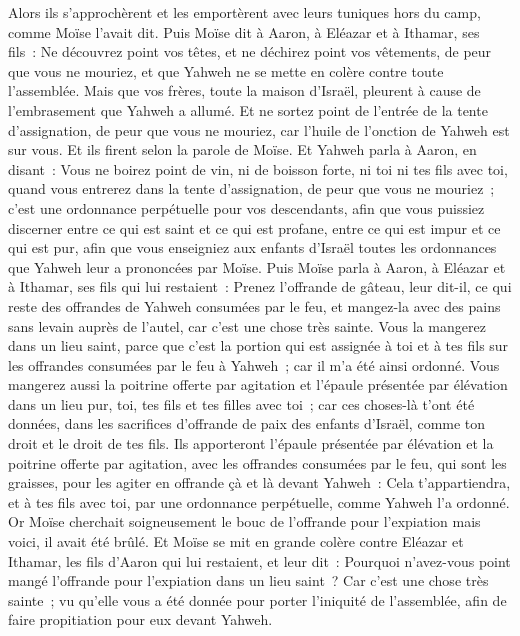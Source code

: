 \begin{multicols}{2}
Alors ils s'approchèrent et les emportèrent avec leurs tuniques hors du camp, comme Moïse l'avait dit.
Puis Moïse dit à Aaron, à Eléazar et à Ithamar, ses fils~: Ne découvrez point vos têtes, et ne déchirez point vos vêtements, de peur que vous ne mouriez, et que Yahweh ne se mette en colère contre toute l'assemblée. Mais que vos frères, toute la maison d'Israël, pleurent à cause de l'embrasement que Yahweh a allumé.
Et ne sortez point de l'entrée de la tente d'assignation, de peur que vous ne mouriez, car l'huile de l'onction de Yahweh est sur vous. Et ils firent selon la parole de Moïse.
Et Yahweh parla à Aaron, en disant~:
Vous ne boirez point de vin, ni de boisson forte, ni toi ni tes fils avec toi, quand vous entrerez dans la tente d'assignation, de peur que vous ne mouriez~; c'est une ordonnance perpétuelle pour vos descendants,
afin que vous puissiez discerner entre ce qui est saint et ce qui est profane, entre ce qui est impur et ce qui est pur,
afin que vous enseigniez aux enfants d'Israël toutes les ordonnances que Yahweh leur a prononcées par Moïse.
Puis Moïse parla à Aaron, à Eléazar et à Ithamar, ses fils qui lui restaient~: Prenez l'offrande de gâteau, leur dit-il, ce qui reste des offrandes de Yahweh consumées par le feu, et mangez-la avec des pains sans levain auprès de l'autel, car c'est une chose très sainte.
Vous la mangerez dans un lieu saint, parce que c'est la portion qui est assignée à toi et à tes fils sur les offrandes consumées par le feu à Yahweh~; car il m'a été ainsi ordonné.
Vous mangerez aussi la poitrine offerte par agitation et l'épaule présentée par élévation dans un lieu pur, toi, tes fils et tes filles avec toi~; car ces choses-là t'ont été données, dans les sacrifices d'offrande de paix des enfants d'Israël, comme ton droit et le droit de tes fils.
Ils apporteront l'épaule présentée par élévation et la poitrine offerte par agitation, avec les offrandes consumées par le feu, qui sont les graisses, pour les agiter en offrande çà et là devant Yahweh~: Cela t'appartiendra, et à tes fils avec toi, par une ordonnance perpétuelle, comme Yahweh l'a ordonné.
Or Moïse cherchait soigneusement le bouc de l'offrande pour l'expiation mais voici, il avait été brûlé. Et Moïse se mit en grande colère contre Eléazar et Ithamar, les fils d'Aaron qui lui restaient, et leur dit~:
Pourquoi n'avez-vous point mangé l'offrande pour l'expiation dans un lieu saint~? Car c'est une chose très sainte~; vu qu'elle vous a été donnée pour porter l'iniquité de l'assemblée, afin de faire propitiation pour eux devant Yahweh.

\end{multicols}
